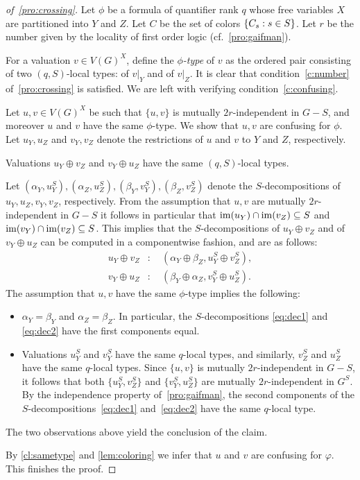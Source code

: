 \begin{proof}[of~\cref{pro:crossing}]
Let $\phi$ be a formula
	of  quantifier rank $q$
   whose free variables $X$ are partitioned into $Y$ and $Z$.
  Let $C$ be the set of colors $\{C_s:s\in S\}$.
  Let $r$ be the number given by the locality of first order logic (cf.~\cref{pro:gaifman}).
  

	For a valuation $v\in V(G)^X$, define the \emph{$\phi$-type} of $v$
  as the ordered pair consisting of two $(q,S)$-local types: of $v|_Y$  and of $v|_Z$. 
 It is clear that condition~\eqref{c:number} of~\cref{pro:crossing} is satisfied. We are left with verifying condition~\eqref{c:confusing}.
	
Let $u,v\in V(G)^X$ be such that $\{u,v\}$ is mutually $2r$-independent in $G-S$,
and moreover $u$ and $v$ have the same $\phi$-type. We show that $u,v$
are confusing for $\phi$. 
Let $u_Y,u_Z$ and $v_Y,v_Z$ denote the restrictions of $u$ and $v$ to $Y$ and $Z$, respectively. 

\begin{claim}\label{cl:sametype}
Valuations $u_Y\oplus v_Z$ and $v_Y\oplus u_Z$ have the same 
$(q,S)$-local types.  
\end{claim}
\begin{clproof}
Let $(\alpha_Y,u_Y^S),(\alpha_Z,u_Z^S),(\beta_Y,v_Y^S),(\beta_Z,v_Z^S)$ denote the $S$-decompositions of  $u_Y,u_Z,v_Y,v_Z$, respectively. 
From the assumption that $u,v$ are mutually $2r$-independent in $G-S$ it follows in particular that
 $\mathrm{im}(u_Y)\cap\mathrm{im}(v_Z)\subseteq S$
and  $\mathrm{im}(v_Y)\cap \mathrm{im}(v_Z)\subseteq S$.
This implies that the $S$-decompositions of $u_Y\oplus v_Z$
and of  $v_Y\oplus u_Z$ can be computed in a componentwise fashion, and are as follows:
\begin{align}
u_Y\oplus v_Z &\colon \quad (\alpha_Y\oplus \beta_Z,  u_Y^S\oplus v_Z^S)\label{eq:dec1},\\  
v_Y\oplus u_Z &\colon \quad (\beta_Y\oplus \alpha_Z, v_Y^S\oplus u_Z^S)\label{eq:dec2}.
\end{align}
The assumption that $u,v$ have the same $\phi$-type implies the following:
\begin{itemize}
  \item  $\alpha_Y=\beta_Y$ and $\alpha_Z=\beta_Z$.
  In particular, the $S$-decompositions
  \eqref{eq:dec1} and \eqref{eq:dec2}  have the first components equal.
  
    \item Valuations $u_Y^S$ and  $v_Y^S$ have 
  the same $q$-local types, and similarly,
  $v_Z^S$ and  $u_Z^S$ have the same $q$-local types.
  Since $\{u,v\}$ is mutually $2r$-independent in $G-S$, it follows that both $\{u_Y^S,v_Z^S\}$ and $\{v_Y^S,u_Z^S\}$ are mutually $2r$-independent in $G^S$.
  By the independence property of~\cref{pro:gaifman}, the second components of the $S$-decompositions~\eqref{eq:dec1} and~\eqref{eq:dec2}
  have the same $q$-local type. 
\end{itemize}
The two observations above yield the conclusion of the claim.
\end{clproof}
By \cref{cl:sametype} and \cref{lem:coloring} we infer that $u$ and $v$ are confusing for $\varphi$. This finishes the proof.
\end{proof}
